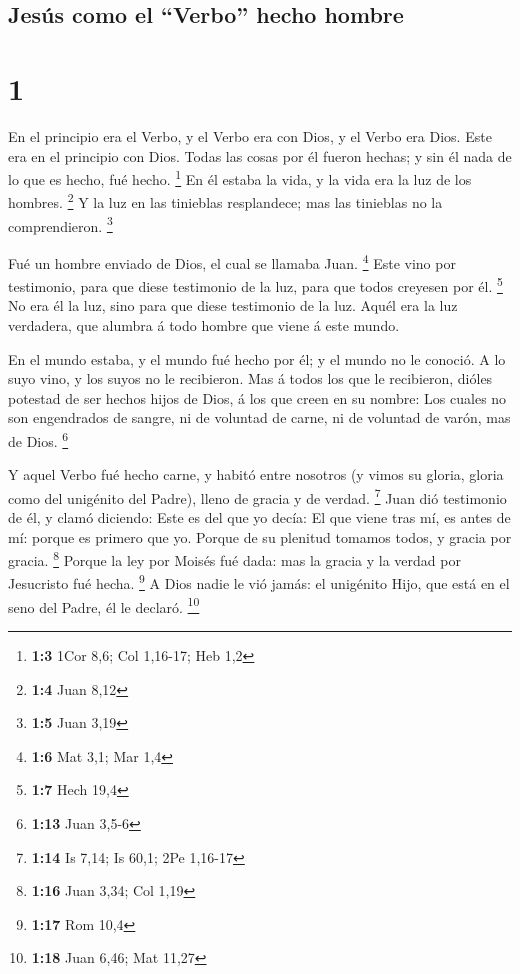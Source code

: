 \hypertarget{jesuxfas-como-el-verbo-hecho-hombre}{%
\subsection{Jesús como el ``Verbo'' hecho
hombre}\label{jesuxfas-como-el-verbo-hecho-hombre}}

\hypertarget{section}{%
\section{1}\label{section}}

 En el principio era el Verbo, y el Verbo era con Dios, y
el Verbo era Dios.  Este era en el principio con Dios.
 Todas las cosas por él fueron hechas; y sin él nada de lo
que es hecho, fué hecho. \footnote{\textbf{1:3} 1Cor 8,6; Col 1,16-17;
  Heb 1,2}  En él estaba la vida, y la vida era la luz de
los hombres. \footnote{\textbf{1:4} Juan 8,12}  Y la luz
en las tinieblas resplandece; mas las tinieblas no la comprendieron.
\footnote{\textbf{1:5} Juan 3,19}

 Fué un hombre enviado de Dios, el cual se llamaba Juan.
\footnote{\textbf{1:6} Mat 3,1; Mar 1,4}  Este vino por
testimonio, para que diese testimonio de la luz, para que todos creyesen
por él. \footnote{\textbf{1:7} Hech 19,4}  No era él la
luz, sino para que diese testimonio de la luz.  Aquél era
la luz verdadera, que alumbra á todo hombre que viene á este mundo.

 En el mundo estaba, y el mundo fué hecho por él; y el
mundo no le conoció.  A lo suyo vino, y los suyos no le
recibieron.  Mas á todos los que le recibieron, dióles
potestad de ser hechos hijos de Dios, á los que creen en su nombre:
 Los cuales no son engendrados de sangre, ni de voluntad
de carne, ni de voluntad de varón, mas de Dios. \footnote{\textbf{1:13}
  Juan 3,5-6}

 Y aquel Verbo fué hecho carne, y habitó entre nosotros
(y vimos su gloria, gloria como del unigénito del Padre), lleno de
gracia y de verdad. \footnote{\textbf{1:14} Is 7,14; Is 60,1; 2Pe
  1,16-17}  Juan dió testimonio de él, y clamó diciendo:
Este es del que yo decía: El que viene tras mí, es antes de mí: porque
es primero que yo.  Porque de su plenitud tomamos todos,
y gracia por gracia. \footnote{\textbf{1:16} Juan 3,34; Col 1,19}
 Porque la ley por Moisés fué dada: mas la gracia y la
verdad por Jesucristo fué hecha. \footnote{\textbf{1:17} Rom 10,4}
 A Dios nadie le vió jamás: el unigénito Hijo, que está
en el seno del Padre, él le declaró. \footnote{\textbf{1:18} Juan 6,46;
  Mat 11,27}

